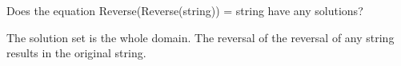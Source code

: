 \documentclass{ximera}
\begin{document}


\begin{exercise}

Does the equation Reverse(Reverse(string)) = string have any solutions?

  \begin{multipleChoice}
  \end{multipleChoice}
  \begin{feedback}
The solution set is the whole domain.  The reversal of the reversal of any string results in the original string.
  \end{feedback}
\end{exercise}
\end{document}
